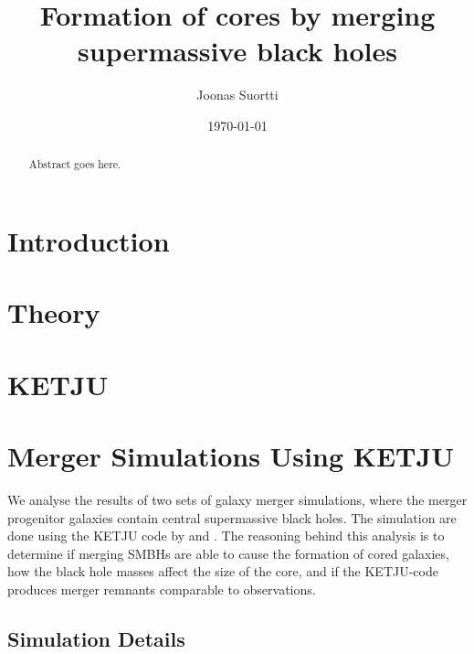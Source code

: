 \documentclass[english, oneside]{HYgradu}
\title{Formation of cores by merging supermassive black holes}
\author{Joonas Suortti}
\date{\today}
\begin{document}
\maketitle

\begin{abstract}
Abstract goes here.
\end{abstract}

\mytableofcontents



\chapter{Introduction}

\chapter{Theory}

\chapter{KETJU}

\chapter{Merger Simulations Using KETJU}

We analyse the results of two sets of galaxy merger simulations, where the merger progenitor galaxies contain central supermassive black holes. The simulation are done using the KETJU code by \cite{Mannerkoski2019} and \cite{Rantala2018}. The reasoning behind this analysis is to determine if merging SMBHs are able to cause the formation of cored galaxies, how the black hole masses affect the size of the core, and if the KETJU-code produces merger remnants comparable to observations. 

\section{Simulation Details}
\end{document}
